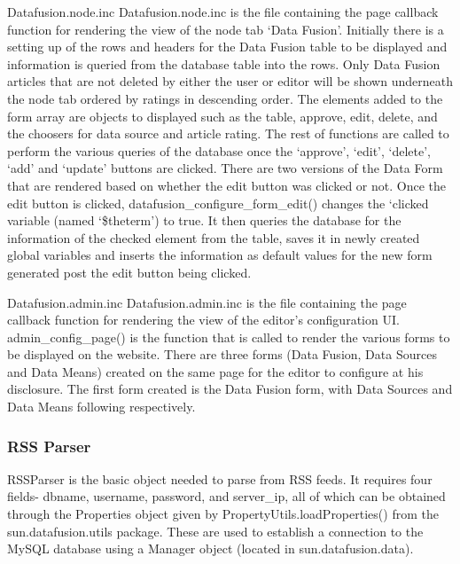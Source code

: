 \documentclass[11pt]{article} %
\begin{document}
Datafusion.node.inc
Datafusion.node.inc is the file containing the page callback function for rendering the view of the node tab ‘Data Fusion’. Initially there is a setting up of the rows and headers for the Data Fusion table to be displayed and information is queried from the database table into the rows. Only Data  Fusion articles that are not deleted by either the user or editor will be shown underneath the node tab ordered by ratings in descending order. The elements added to the form array are objects to displayed such as the table, approve, edit, delete, and the choosers for data source and article rating. The rest of functions are called to perform the various queries of the database once the ‘approve’, ‘edit’, ‘delete’, ‘add’ and ‘update’ buttons are clicked. There are two versions of the Data Form that are rendered based on whether the edit button was clicked or not. Once the edit button is clicked, datafusion\_configure\_form\_edit() changes the ‘clicked variable (named ‘\$theterm’) to true. It then queries the database for the information of the checked element from the table, saves it in newly created global variables and inserts the information as default values for the new form generated post the edit button being clicked.

Datafusion.admin.inc
Datafusion.admin.inc is the file containing the page callback function for rendering the view of the editor’s configuration UI. admin\_config\_page() is the function that is called to render the various forms to be displayed on the website. There are three forms (Data Fusion, Data Sources and Data Means) created on the same page for the editor to configure at his disclosure. The first form created is the Data Fusion form, with Data Sources and Data Means following respectively.

\subsubsection{RSS Parser}

RSSParser is the basic object needed to parse from RSS feeds. It requires four fields- dbname, username, password, and server\_ip, all of which can be obtained through the Properties object given by PropertyUtils.loadProperties() from the sun.datafusion.utils package. These are used to establish a connection to the MySQL database using a Manager object (located in sun.datafusion.data).
\end{document}
